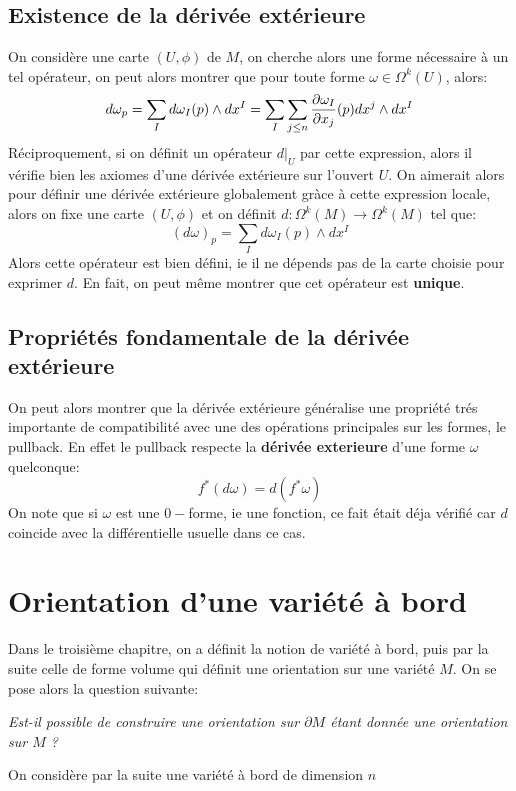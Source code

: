    \pagebreak
   \section{Existence de la dérivée extérieure}
      On considère une carte \( (U, \phi) \) de \( M \), on cherche alors une forme nécessaire à un tel opérateur, on peut alors montrer que pour toute forme \( \omega \in \Omega^k(U) \), alors:
      \[ 
         d\omega_p = \sum_I d\omega_I(p) \wedge dx^I = \sum_I \sum_{j \leq n} \frac{\partial \omega_I}{\partial x_j}(p) dx^j \wedge dx^I
      \]
      Réciproquement, si on définit un opérateur \( d|_U \) par cette expression, alors il vérifie bien les axiomes d'une dérivée extérieure sur l'ouvert \( U \). On aimerait alors pour définir une dérivée extérieure globalement gràce à cette expression locale, alors on fixe une carte \( (U, \phi) \) et on définit \( d : \Omega^k(M) \longrightarrow \Omega^k(M) \) tel que:
      \[ 
         (d\omega)_p = \sum_I d\omega_I(p) \wedge dx^I
      \]
      Alors cette opérateur est bien défini, ie il ne dépends pas de la carte choisie pour exprimer \( d \). En fait, on peut même montrer que cet opérateur est \textbf{unique}.   
   \section{Propriétés fondamentale de la dérivée extérieure}
      On peut alors montrer que la dérivée extérieure généralise une propriété trés importante de compatibilité avec une des opérations principales sur les formes, le pullback. En effet le pullback respecte la \textbf{dérivée exterieure} d'une forme \( \omega \) quelconque:
      \[ 
         f^*(d\omega) = d(f^*\omega)
      \]
      On note que si \( \omega \) est une \( 0-\)forme, ie une fonction, ce fait était déja vérifié car \( d \) coincide avec la différentielle usuelle dans ce cas.

\chapter{Orientation d'une variété à bord}
   Dans le troisième chapitre, on a définit la notion de variété à bord, puis par la suite celle de forme volume qui définit une orientation sur une variété \( M \). On se pose alors la question suivante:
   \begin{center}
      \textit{Est-il possible de construire une orientation sur \( \partial M \) étant donnée une orientation sur \( M \) ?}
   \end{center}
   On considère par la suite une variété à bord de dimension \( n \)

